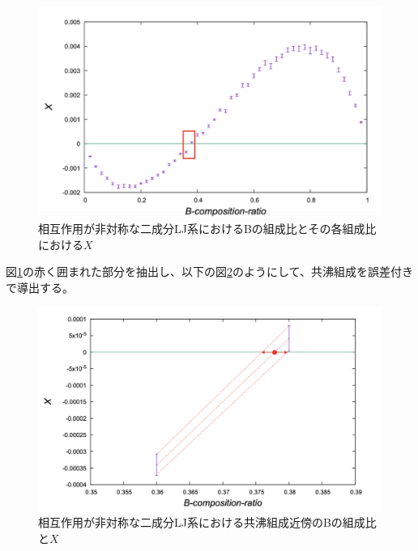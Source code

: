 \documentclass[titlepage]{jsreport}
\begin{document}
\begin{figure}[htbp]
    \begin{center}
        \includegraphics[width=14cm]{fig/bi-asymmetric-b/L100T1.0E1.05.pdf}
    \end{center}
    \caption{相互作用が非対称な二成分LJ系におけるBの組成比とその各組成比における$X$}
    \label{fig:bi-asymmetric-b}
\end{figure}

\newpage
図\ref{fig:bi-asymmetric-b}の赤く囲まれた部分を抽出し、以下の図\ref{fig:bi-asymmetric-b-part}のようにして、共沸組成を誤差付きで導出する。

\begin{figure}[htbp]
    \begin{center}
        \includegraphics[width=14cm]{fig/bi-asymmetric-b-part/L100T1.0E1.05.pdf}
    \end{center}
    \caption{相互作用が非対称な二成分LJ系における共沸組成近傍のBの組成比と$X$}
    \label{fig:bi-asymmetric-b-part}
\end{figure}
\end{document}
